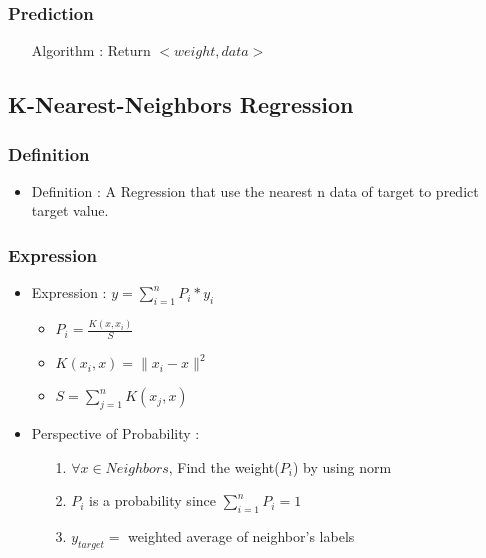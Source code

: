 \documentclass{article}
\begin{document}
\subsubsection{Prediction}
\begin{itemize}
    \item[Algorithm] : Return $<weight, data>$
\end{itemize}


\subsection{K-Nearest-Neighbors Regression}
\subsubsection{Definition}
\begin{itemize}
    \item Definition : A Regression that use the nearest n data of target to predict target value.
\end{itemize}

\subsubsection{Expression}
\begin{itemize}
    \item Expression : $y = \sum_{i=1}^{n}{P_i*y_i}$
        \begin{itemize}
            \item $P_i = \frac{K(x,x_i)}{S}$
            \item $K(x_i,x) = \|x_i-x\|^2$
            \item $S = \sum_{j=1}^{n}{K(x_j,x)}$
        \end{itemize}
    \item Perspective of Probability :
    \begin{itemize}
         \item[1.] $\forall{x\in {Neighbors}}$, Find the weight($P_i$) by using norm
         \item[2.] $P_i$ is a probability since $\sum_{i=1}^{n}{P_i} = 1$
         \item[3.] $y_{target} = $ weighted average of neighbor's labels
    \end{itemize}
\end{itemize}
\end{document}
